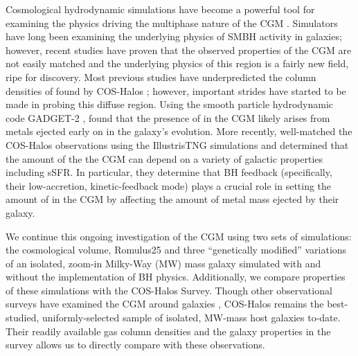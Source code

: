 \documentclass[]{emulateapj}
\begin{document}
Cosmological hydrodynamic simulations have become a powerful tool for examining the physics driving the multiphase nature of the CGM \citep{Cen2013,Ford2016b,Oppenheimer2016,Suresh2017,Nelson2018}. Simulators have long been examining the underlying physics of SMBH activity in galaxies; however, recent studies have proven that the observed properties of the CGM are not easily matched and the underlying physics of this region is a fairly new field, ripe for discovery. Most previous studies have underpredicted the column densities of  found by COS-Halos  \citep[including the aforementioned studies,][]{Oppenheimer2008,Suresh2017}; however, important strides have started to be made in probing this diffuse region. Using the smooth particle hydrodynamic code GADGET-2 \citep{Springel2005a,Oppenheimer2008}, \cite{Ford2016a} found that the presence of  in the CGM likely arises from metals ejected early on in the galaxy's evolution. More recently, \cite{Nelson2018} well-matched the COS-Halos observations using the IllustrisTNG simulations and determined that the amount of  the the CGM can depend on a variety of galactic properties including sSFR. In particular, they determine that BH feedback (specifically, their low-accretion, kinetic-feedback mode) plays a crucial role in setting the amount of  in the CGM by affecting the amount of metal mass ejected by their galaxy.

We continue this ongoing investigation of the CGM using two sets of simulations: the cosmological volume, {\sc Romulus25} \citep{Tremmel2017} and three ``genetically modified'' variations of an isolated, zoom-in Milky-Way (MW) mass galaxy \citep{Roth2016,Pontzen2016} simulated with and without the implementation of BH physics. Additionally, we compare properties of these simulations with the COS-Halos Survey. Though other observational surveys have examined the CGM around galaxies \citep{Stocke2013,Borthakur2015,Danforth2016}, COS-Halos \citep{Tumlinson2011} remains the best-studied, uniformly-selected sample of isolated, MW-mass host galaxies to-date. Their readily available gas column densities and the galaxy properties in the survey allows us to directly compare with these observations. 
\end{document}

